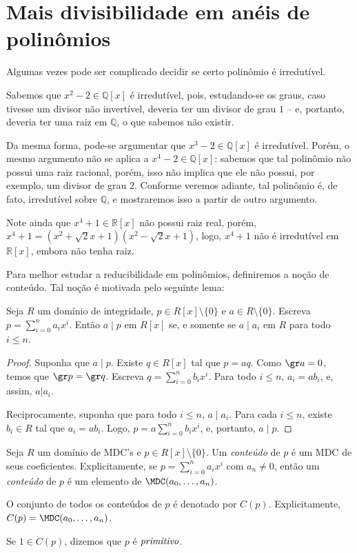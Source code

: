\section{Mais divisibilidade em anéis de polinômios}
    Algumas vezes pode ser complicado decidir se certo polinômio é irredutível.

    Sabemos que $x^2-2\in \mathbb Q[x]$ é irredutível, pois, estudando-se os graus, caso tivesse um divisor não invertível, deveria ter um divisor de grau $1$ -- e, portanto, deveria ter uma raiz em $\mathbb Q$, o que sabemos não existir.

    Da mesma forma, pode-se argumentar que $x^3-2\in \mathbb Q[x]$ é irredutível. Porém, o mesmo argumento não se aplica a $x^4-2\in \mathbb Q[x]$: sabemos que tal polinômio não possui uma raiz racional, porém, isso não implica que ele não possui, por exemplo, um divisor de grau $2$.
    Conforme veremos adiante, tal polinômio é, de fato, irredutível sobre $\mathbb Q$, e mostraremos isso a partir de outro argumento.

    Note ainda que $x^4+1\in \mathbb R[x]$ não possui raiz real, porém, $x^4+1=(x^2+\sqrt 2 x+1)(x^2-\sqrt 2 x+1)$, logo, $x^4+1$ não é irredutível em $\mathbb R[x]$, embora não tenha raiz.

    Para melhor estudar a reducibilidade em polinômios, definiremos a noção de conteúdo. Tal noção é motivada pelo seguinte lema:

    \begin{lemma}\label{lemma:preConteudo}
    Seja $R$ um domínio de integridade, $p \in R[x]\setminus \{0\}$ e $a \in R\setminus \{0\}$. Escreva $p=\sum_{i=0}^n a_i x^i$. Então $a\mid p$ em $R[x]$ se, e somente se $a\mid a_i$ em $R$ para todo $i\leq n$.
    \end{lemma}
    \begin{proof}
        Suponha que $a\mid p$. Existe $q\in R[x]$ tal que $p=aq$. Como $\gr a=0$, temos que $\gr p=\gr q$. Escreva $q=\sum_{i=0}^n b_i x^i$. Para todo $i\leq n$, $a_i=ab_i$, e, assim, $a|a_i$.
        
        Reciprocamente, suponha que para todo $i\leq n$, $a\mid a_i$. Para cada $i\leq n$, existe $b_i \in R$ tal que $a_i=ab_i$. Logo, $p=a\sum_{i=0}^n b_i x^i$, e, portanto, $a\mid p$.
    \end{proof}

    \begin{definition}
        Seja $R$ um domínio de MDC's e $p \in R[x]\setminus \{0\}$. Um \emph{conteúdo} de $p$ é um MDC de seus coeficientes. Explicitamente, se $p=\sum_{i=0}^n a_i x^i$ com $a_n\neq 0$, então um \emph{conteúdo} de $p$ é um elemento de $\MDC(a_0, \dots, a_n)$.

        O conjunto de todos os conteúdos de $p$ é denotado por $C(p)$.
        Explicitamente, $C(p)=\MDC(a_0, \dots, a_n)$.

        Se $1 \in C(p)$, dizemos que $p$ é $\emph{primitivo}$.
    \end{definition}

